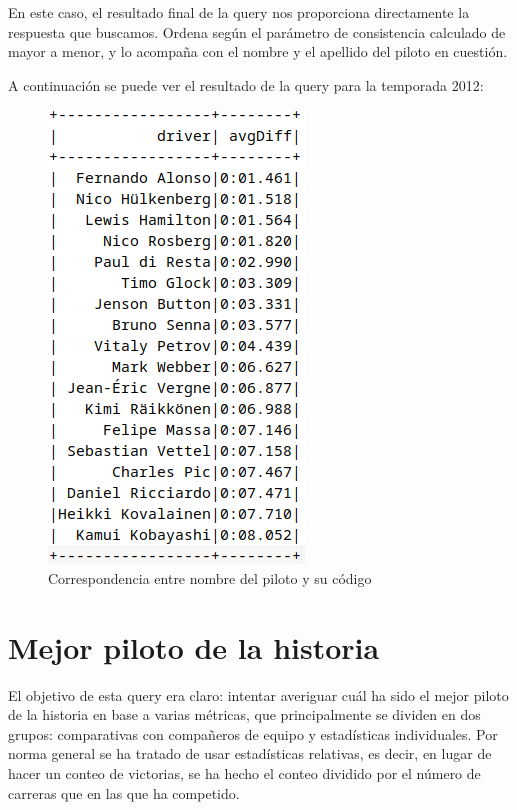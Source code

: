 \documentclass[12pt,twoside,titlepage]{report}
\begin{document}
En este caso, el resultado final de la query nos proporciona directamente la respuesta que buscamos. Ordena según el parámetro de consistencia calculado de mayor a menor, y lo acompaña con el nombre y el apellido del piloto en cuestión.

A continuación se puede ver el resultado de la query para la temporada 2012:

\begin{figure}[H]
	\includegraphics[scale=0.4]{results/consistency/2012consistency.png}
	\centering
	\caption{Correspondencia entre nombre del piloto y su código}
	\label{fig:2012consistency}
	\centering
\end{figure}

\section{Mejor piloto de la historia}

El objetivo de esta query era claro: intentar averiguar cuál ha sido el mejor piloto de la historia en base a varias métricas, que principalmente se dividen en dos grupos: comparativas con compañeros de equipo y estadísticas individuales. Por norma general se ha tratado de usar estadísticas relativas, es decir, en lugar de hacer un conteo de victorias, se ha hecho el conteo dividido por el número de carreras que en las que ha competido.
\end{document}
